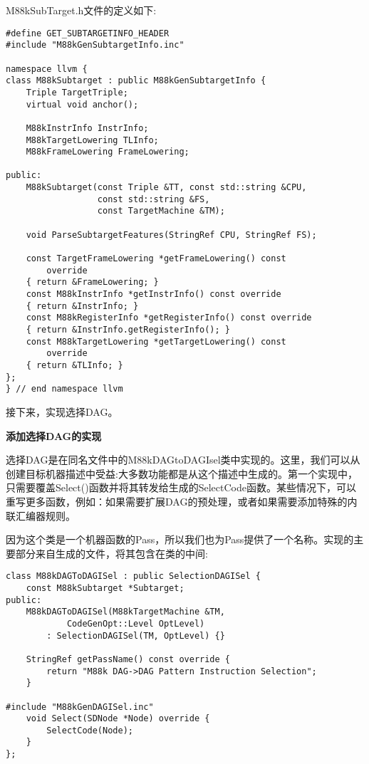 M88kSubTarget.h文件的定义如下:\par

\begin{lstlisting}[caption={}]
#define GET_SUBTARGETINFO_HEADER
#include "M88kGenSubtargetInfo.inc"

namespace llvm {
class M88kSubtarget : public M88kGenSubtargetInfo {
	Triple TargetTriple;
	virtual void anchor();
	
	M88kInstrInfo InstrInfo;
	M88kTargetLowering TLInfo;
	M88kFrameLowering FrameLowering;
	
public:
	M88kSubtarget(const Triple &TT, const std::string &CPU,
				  const std::string &FS,
				  const TargetMachine &TM);
				  
	void ParseSubtargetFeatures(StringRef CPU, StringRef FS);
	
	const TargetFrameLowering *getFrameLowering() const
		override
	{ return &FrameLowering; }
	const M88kInstrInfo *getInstrInfo() const override
	{ return &InstrInfo; }
	const M88kRegisterInfo *getRegisterInfo() const override
	{ return &InstrInfo.getRegisterInfo(); }
	const M88kTargetLowering *getTargetLowering() const
		override
	{ return &TLInfo; }
};
} // end namespace llvm
\end{lstlisting}

接下来，实现选择DAG。\par

\hspace*{\fill} \par %
\textbf{添加选择DAG的实现}

选择DAG是在同名文件中的M88kDAGtoDAGIsel类中实现的。这里，我们可以从创建目标机器描述中受益:大多数功能都是从这个描述中生成的。第一个实现中，只需要覆盖Select()函数并将其转发给生成的SelectCode函数。某些情况下，可以重写更多函数，例如：如果需要扩展DAG的预处理，或者如果需要添加特殊的内联汇编器规则。\par

因为这个类是一个机器函数的Pass，所以我们也为Pass提供了一个名称。实现的主要部分来自生成的文件，将其包含在类的中间:\par

\begin{lstlisting}[caption={}]
class M88kDAGToDAGISel : public SelectionDAGISel {
	const M88kSubtarget *Subtarget;
public:
	M88kDAGToDAGISel(M88kTargetMachine &TM,
			CodeGenOpt::Level OptLevel)
		: SelectionDAGISel(TM, OptLevel) {}
		
	StringRef getPassName() const override {
		return "M88k DAG->DAG Pattern Instruction Selection";
	}

#include "M88kGenDAGISel.inc"
	void Select(SDNode *Node) override {
		SelectCode(Node);
	}
};
\end{lstlisting}

